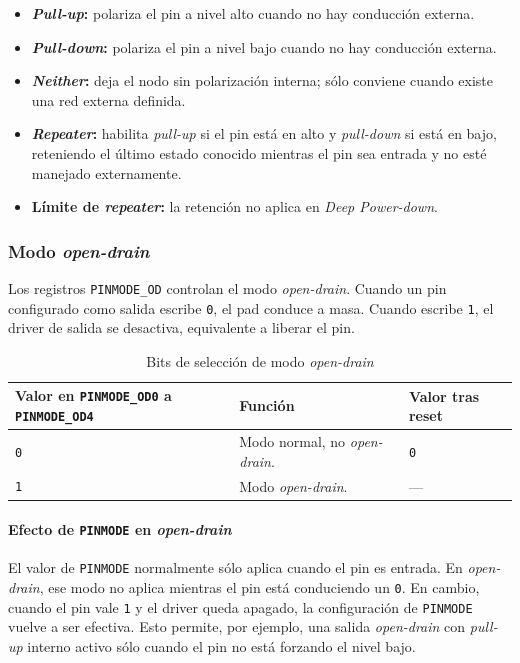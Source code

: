 \begin{itemize}
  \item \textbf{\textit{Pull-up}:} polariza el pin a nivel alto cuando no hay conducción externa.
  \item \textbf{\textit{Pull-down}:} polariza el pin a nivel bajo cuando no hay conducción externa.
  \item \textbf{\textit{Neither}:} deja el nodo sin polarización interna; sólo conviene cuando existe una red externa definida.
  \item \textbf{\textit{Repeater}:} habilita \textit{pull-up} si el pin está en alto y \textit{pull-down} si está en bajo, reteniendo el último estado conocido mientras el pin sea entrada y no esté manejado externamente.
  \item \textbf{Límite de \textit{repeater}:} la retención no aplica en \textit{Deep Power-down}.
\end{itemize}



\subsubsection{Modo \textit{open-drain}}
Los registros \texttt{PINMODE\_OD} controlan el modo \textit{open-drain}. Cuando un pin configurado como salida escribe \texttt{0}, el pad conduce a masa. Cuando escribe \texttt{1}, el driver de salida se desactiva, equivalente a liberar el pin.

\begin{table}[H]
  \centering
  \small
  \renewcommand{\arraystretch}{1.15}
  \caption{Bits de selección de modo \textit{open-drain}}
  \begin{tabularx}{0.9\textwidth}{|>{\raggedright\arraybackslash}p{}|>{\raggedright\arraybackslash}X|>{\raggedright\arraybackslash}p{}|}
    \hline
    \textbf{Valor en \texttt{PINMODE\_OD0} a \texttt{PINMODE\_OD4}} & \textbf{Función} & \textbf{Valor tras reset} \\
    \hline
    \texttt{0} & Modo normal, no \textit{open-drain}. & \texttt{0} \\
    \hline
    \texttt{1} & Modo \textit{open-drain}. & --- \\
    \hline
  \end{tabularx}
\end{table}

\paragraph{Efecto de \texttt{PINMODE} en \textit{open-drain}}
El valor de \texttt{PINMODE} normalmente sólo aplica cuando el pin es entrada. En \textit{open-drain}, ese modo no aplica mientras el pin está conduciendo un \texttt{0}. En cambio, cuando el pin vale \texttt{1} y el driver queda apagado, la configuración de \texttt{PINMODE} vuelve a ser efectiva. Esto permite, por ejemplo, una salida \textit{open-drain} con \textit{pull-up} interno activo sólo cuando el pin no está forzando el nivel bajo.

